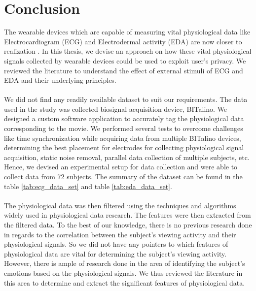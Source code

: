 
\section{Conclusion}
The wearable devices which are capable of measuring vital physiological data like Electrocardiogram (ECG) and Electrodermal activity (EDA) are now closer to realization \cite{haghi_wearable_2017}. In this thesis, we devise an approach on how these vital physiological signals collected by wearable devices could be used to exploit user's privacy. We reviewed the literature to understand the effect of external stimuli of ECG and EDA and their underlying principles.

\paragraph{} We did not find any readily available dataset to suit our requirements. The data used in the study was collected biosignal acquisition device, BITalino. We designed a custom software application to accurately tag the physiological data corresponding to the movie. We performed several tests to overcome challenges like time synchronization while acquiring data from multiple BITalino devices, determining the best placement for electrodes for collecting physiological signal acquisition, static noise removal, parallel data collection of multiple subjects, etc. Hence, we devised an experimental setup for data collection and were able to collect data from 72 subjects. The summary of the dataset can be found in the table \ref{tab:ecg_data_set} and table \ref{tab:eda_data_set}.

\paragraph{} The physiological data was then filtered using the techniques and algorithms widely used in physiological data research. The features were then extracted from the filtered data. To the best of our knowledge, there is no previous research done in regards to the correlation between the subject's viewing activity and their physiological signals. So we did not have any pointers to which features of physiological data are vital for determining the subject's viewing activity. However, there is ample of research done in the area of identifying the subject's emotions based on the physiological signals. We thus reviewed the literature in this area to determine and extract the significant features of physiological data.

